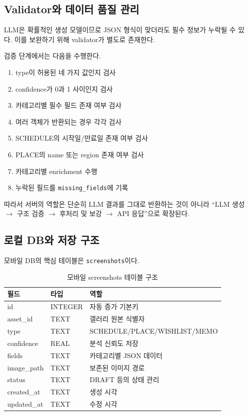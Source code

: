 \documentclass[11pt,a4paper]{article}
\begin{document}
\subsection{Validator와 데이터 품질 관리}

LLM은 확률적인 생성 모델이므로 JSON 형식이 맞더라도 필수 정보가 누락될 수 있다. 이를 보완하기 위해 validator가 별도로 존재한다.

검증 단계에서는 다음을 수행한다.

\begin{enumerate}
    \item type이 허용된 네 가지 값인지 검사
    \item confidence가 0과 1 사이인지 검사
    \item 카테고리별 필수 필드 존재 여부 검사
    \item 여러 객체가 반환되는 경우 각각 검사
    \item SCHEDULE의 시작일/만료일 존재 여부 검사
    \item PLACE의 name 또는 region 존재 여부 검사
    \item 카테고리별 enrichment 수행
    \item 누락된 필드를 \texttt{missing\_fields}에 기록
\end{enumerate}

따라서 서버의 역할은 단순히 LLM 결과를 그대로 반환하는 것이 아니라 ``LLM 생성 $\rightarrow$ 구조 검증 $\rightarrow$ 후처리 및 보강 $\rightarrow$ API 응답''으로 확장된다.

\subsection{로컬 DB와 저장 구조}

모바일 DB의 핵심 테이블은 \texttt{screenshots}이다.

\begin{table}[H]
\centering
\small
\begin{tabularx}{\linewidth}{l l Y}
\toprule
\textbf{필드} & \textbf{타입} & \textbf{역할}\\
\midrule
id & INTEGER & 자동 증가 기본키\\
asset\_id & TEXT & 갤러리 원본 식별자\\
type & TEXT & SCHEDULE/PLACE/WISHLIST/MEMO\\
confidence & REAL & 분석 신뢰도 저장\\
fields & TEXT & 카테고리별 JSON 데이터\\
image\_path & TEXT & 보존된 이미지 경로\\
status & TEXT & DRAFT 등의 상태 관리\\
created\_at & TEXT & 생성 시각\\
updated\_at & TEXT & 수정 시각\\
\bottomrule
\end{tabularx}
\caption{모바일 screenshots 테이블 구조}
\end{table}
\end{document}
